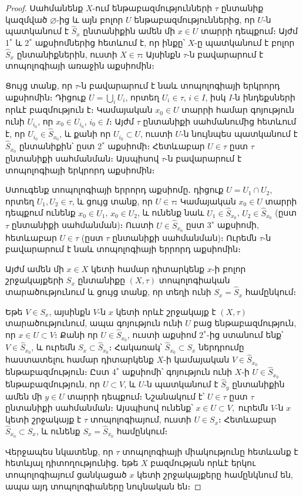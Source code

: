 \documentclass[./main.tex]{subfiles}
\begin{document}
\begin{proof}
Սահմանենք $X$-ում ենթաբազմությունների $\tau$ ընտանիք կազմված $\varnothing$-ից  և այն բոլոր $U$ ենթաբազմություններից, որ $U$-ն պատկանում է $\hat{S}_x$ ընտանիքին  ամեն մի $x\in U$ տարրի դեպքում։ Այժմ 1$^{\ast}$ և 2$^{\ast}$ աքսիոմներից հետևում է, որ ինքը՝ \linebreak $X$-ը պատկանում է բոլոր $\hat{S}_x$ ընտանիքներին, ուստի $X\in \tau$։ Այսինքն $\tau$-ն բավարա\-րում է տոպոլոգիայի առաջին աքսիոմին։

\par Ցույց տանք, որ $\tau$-ն բավարարում է նաև տոպոլոգիայի երկրորդ աքսիոմին։ Դիցուք $U = \bigcup\limits_i U_i$, որտեղ $U_i \in \tau$, $i\in I$,  իսկ  $I$-ն ինդեքսների որևէ բազմություն է։ Կամայական $x_0 \in U$ տարրի համար գոյություն ունի $U_{i_{0}}$, որ $x_0 \in U_{i_{0}}$, $i_0\in I$։ Այժմ $\tau$ ընտանիքի սահմանումից հետևում է, որ $U_{i_{0}}\in \hat{S}_{x_{0}}$, և քանի որ $U_{i_{0}}\subset U$, ուստի $U$-ն նույնպես պատկանում է $\hat{S}_{x_{0}}$ ընտանիքին՝ ըստ 2$^\ast$ աքսիոմի։ Հետևաբար $U\in \tau$ ըստ $\tau$ ընտանիքի սահմանման։ Այսպիսով $\tau$-ն բավարարում է տոպոլոգիայի երկրորդ աքսիոմին։

\par Ստուգենք տոպոլոգիայի երրորդ աքսիոմը․ դիցուք ${U = U_1 \cap U_2}$, որտեղ \linebreak ${U_1, U_2 \in \tau}$, և ցույց տանք, որ $U\in\tau$։ Կամայական $x_0 \in U$ տարրի դեպքում ունենք $x_0 \in U_1$, $x_0 \in U_2$, և ունենք նաև $U_1\in \hat{S}_{x_{0}}$, $U_{2}\in \hat{S}_{x_{0}}$ (ըստ $\tau$ ընտանիքի սահմանման)։ Ուստի $U\in \hat{S}_{x_{0}}$ ըստ 3$^\ast$ աքսիոմի, հետևաբար $U\in \tau$ (ըստ $\tau$ ընտանիքի սահմանման)։ Ուրեմն $\tau$-ն բավարարում է նաև տոպոլոգիայի երրորդ աքսիոմին։

\par Այժմ ամեն մի ${x\in X}$ կետի համար դիտարկենք $x$-ի բոլոր շրջակայքերի $S_x$ ընտա\-նիքը $(X, \tau)$ տոպոլոգիական տարածությունում և ցույց տանք, որ տեղի ունի $S_x = \hat{S}_x$ համընկում։ 

\par Եթե $V\in S_x$, այսինքն $V$-ն $x$ կետի որևէ շրջակայք է $(X, \tau)$ տարածությունում, ապա գոյություն ունի $U$ բաց ենթաբազմություն, որ ${x\in U \subset V}$։ Քանի որ ${U\in \hat{S}_{x_{0}}}$, ուստի աքսիոմ 2$^\ast$-ից ստանում ենք՝ ${V \in \hat{S}_{x_{0}}}$, և ուրեմն ${S_x \subset \hat{S}_{x_{0}}}$։ Հակառակ՝ ${\hat{S}_{x_{0}} \subset S_x}$ ներդրումը հաստատելու համար դիտարկենք $X$-ի կամայական $V\in \hat{S}_{x_{0}}$ ենթաբազ\-մություն։ Ըստ 4$^\ast$ աքսիոմի՝ գոյություն ունի $X$-ի $U\in \hat{S}_{x_{0}}$ ենթաբազմու\-թյուն, որ $U\subset V$, և $U$-ն պատկանում է $\hat{S}_{y}$ ընտանիքին ամեն մի $y\in U$ տարրի դեպքում։ Նշանակում է՝ $U\in \tau$ ըստ $\tau$ ընտանիքի սահմանման։ Այսպիսով ունենք՝ $x\in U \subset V,$ ուրեմն $V$-ն $x$ կետի շրջակայք է $\tau$ տոպոլոգիայում, ուստի $U \in S_x$։ Հետևաբար $\hat{S}_{x_{0}} \subset S_x$, և ունենք $S_x = \hat{S}_{x_{0}}$ համընկում։

\par Վերջապես նկատենք, որ $\tau$ տոպոլոգիայի միակությունը հետևանք է հետևյալ դիտողությունից․ եթե $X$ բազմության որևէ երկու տոպոլոգիայում ցանկացած $x$ կետի շրջակայքերը համընկնում են, ապա այդ տոպոլոգիաները նույնական են։
\end{proof}



\end{document}

